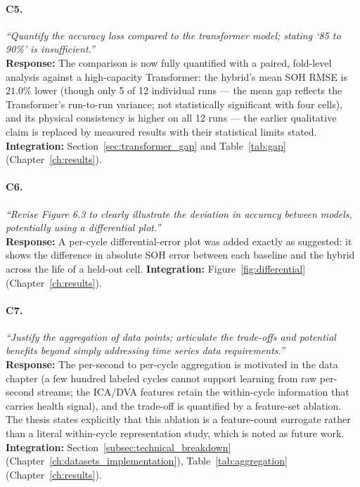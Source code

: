 \paragraph{C5.} \emph{``Quantify the accuracy loss compared to the transformer
model; stating `85 to 90\%' is insufficient.''}\\
\textbf{Response:} The comparison is now fully quantified with a paired,
fold-level analysis against a high-capacity Transformer: the hybrid's mean SOH
RMSE is $21.0\%$ lower (though only 5 of 12 individual runs --- the mean gap
reflects the Transformer's run-to-run variance; not statistically significant
with four cells), and its physical consistency is higher on all 12 runs --- the
earlier qualitative claim is replaced by measured results with their
statistical limits stated.
\textbf{Integration:} Section~\ref{sec:transformer_gap} and
Table~\ref{tab:gap} (Chapter~\ref{ch:results}).

\paragraph{C6.} \emph{``Revise Figure 6.3 to clearly illustrate the deviation
in accuracy between models, potentially using a differential plot.''}\\
\textbf{Response:} A per-cycle differential-error plot was added exactly as
suggested: it shows the difference in absolute SOH error between each baseline
and the hybrid across the life of a held-out cell.
\textbf{Integration:} Figure~\ref{fig:differential}
(Chapter~\ref{ch:results}).

\paragraph{C7.} \emph{``Justify the aggregation of data points; articulate the
trade-offs and potential benefits beyond simply addressing time series data
requirements.''}\\
\textbf{Response:} The per-second to per-cycle aggregation is motivated in the
data chapter (a few hundred labeled cycles cannot support learning from raw
per-second streams; the ICA/DVA features retain the within-cycle information
that carries health signal), and the trade-off is quantified by a feature-set
ablation. The thesis states explicitly that this ablation is a feature-count
surrogate rather than a literal within-cycle representation study, which is
noted as future work.
\textbf{Integration:} Section~\ref{subsec:technical_breakdown}
(Chapter~\ref{ch:datasets_implementation}), Table~\ref{tab:aggregation}
(Chapter~\ref{ch:results}).

